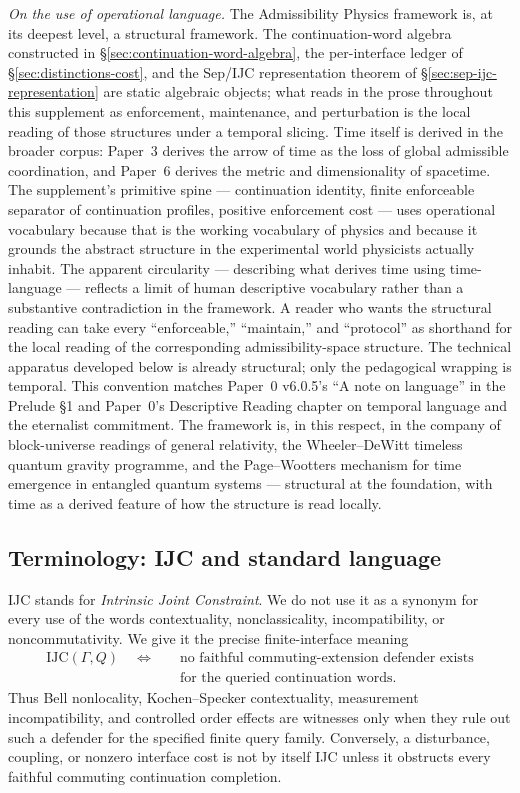 \documentclass[11pt]{article}
\newcommand{\IJC}{\mathrm{IJC}}
\begin{document}
\medskip
\noindent\textit{On the use of operational language.}\quad
The Admissibility Physics framework is, at its deepest level, a structural framework. The continuation-word algebra constructed in \S\ref{sec:continuation-word-algebra}, the per-interface ledger of \S\ref{sec:distinctions-cost}, and the Sep/IJC representation theorem of \S\ref{sec:sep-ijc-representation} are static algebraic objects; what reads in the prose throughout this supplement as enforcement, maintenance, and perturbation is the local reading of those structures under a temporal slicing. Time itself is derived in the broader corpus: Paper~3 derives the arrow of time as the loss of global admissible coordination, and Paper~6 derives the metric and dimensionality of spacetime. The supplement's primitive spine --- continuation identity, finite enforceable separator of continuation profiles, positive enforcement cost --- uses operational vocabulary because that is the working vocabulary of physics and because it grounds the abstract structure in the experimental world physicists actually inhabit. The apparent circularity --- describing what derives time using time-language --- reflects a limit of human descriptive vocabulary rather than a substantive contradiction in the framework. A reader who wants the structural reading can take every ``enforceable,'' ``maintain,'' and ``protocol'' as shorthand for the local reading of the corresponding admissibility-space structure. The technical apparatus developed below is already structural; only the pedagogical wrapping is temporal. This convention matches Paper~0 v6.0.5's ``A note on language'' in the Prelude \S1 and Paper~0's Descriptive Reading chapter on temporal language and the eternalist commitment. The framework is, in this respect, in the company of block-universe readings of general relativity, the Wheeler--DeWitt timeless quantum gravity programme, and the Page--Wootters mechanism for time emergence in entangled quantum systems --- structural at the foundation, with time as a derived feature of how the structure is read locally.

\subsection*{Terminology: IJC and standard language}
IJC stands for \emph{Intrinsic Joint Constraint}. We do not use it as a synonym for every use of the words contextuality, nonclassicality, incompatibility, or noncommutativity. We give it the precise finite-interface meaning
\[
\begin{aligned}
\IJC(\Gamma,Q)
\quad\Longleftrightarrow\quad
&\text{no faithful commuting-extension defender exists}\\
&\text{for the queried continuation words.}
\end{aligned}
\]
Thus Bell nonlocality, Kochen--Specker contextuality, measurement incompatibility, and controlled order effects are witnesses only when they rule out such a defender for the specified finite query family.  Conversely, a disturbance, coupling, or nonzero interface cost is not by itself IJC unless it obstructs every faithful commuting continuation completion.
\end{document}
